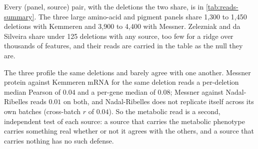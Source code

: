 Every (panel, source) pair, with the deletions the two share, is in
\cref{tab:reads-summary}. The three large amino-acid and pigment panels share 1{,}300 to 1{,}450 deletions with
Kemmeren and 3{,}900 to 4{,}400 with Messner. Zelezniak and da Silveira share under 125
deletions with any source, too few for a ridge over thousands of features, and their reads
are carried in the table as the null they are.



 The three profile the same
deletions and barely agree with one another. Messner protein against Kemmeren mRNA for
the same deletion reads a per-deletion median Pearson of $0.04$ and a per-gene median of
$0.08$; Messner against Nadal-Ribelles reads $0.01$ on both, and Nadal-Ribelles does not
replicate itself across its own batches (cross-batch $r$ of $0.04$). So the metabolic
read is a second, independent test of each source: a source that carries the metabolic
phenotype carries something real whether or not it agrees with the others, and a source
that carries nothing has no such defense.
